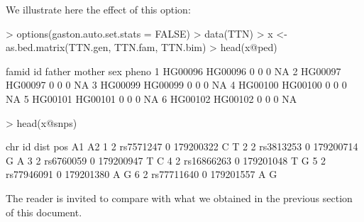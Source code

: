 \documentclass{article}
\renewenvironment{Schunk}{\vspace{\topsep}}{\vspace{\topsep}}
\begin{document}
  We illustrate here the effect of this option:
\begin{Schunk}
\begin{Sinput}
> options(gaston.auto.set.stats = FALSE)
> data(TTN)
> x <- as.bed.matrix(TTN.gen, TTN.fam, TTN.bim)
> head(x@ped)
\end{Sinput}
\begin{Soutput}
    famid      id father mother sex pheno
1 HG00096 HG00096      0      0   0    NA
2 HG00097 HG00097      0      0   0    NA
3 HG00099 HG00099      0      0   0    NA
4 HG00100 HG00100      0      0   0    NA
5 HG00101 HG00101      0      0   0    NA
6 HG00102 HG00102      0      0   0    NA
\end{Soutput}
\begin{Sinput}
> head(x@snps)
\end{Sinput}
\begin{Soutput}
  chr         id dist       pos A1 A2
1   2  rs7571247    0 179200322  C  T
2   2  rs3813253    0 179200714  G  A
3   2  rs6760059    0 179200947  T  C
4   2 rs16866263    0 179201048  T  G
5   2 rs77946091    0 179201380  A  G
6   2 rs77711640    0 179201557  A  G
\end{Soutput}
\end{Schunk}

  The reader is invited to compare with what we obtained in the previous section of this document.
\end{document}
